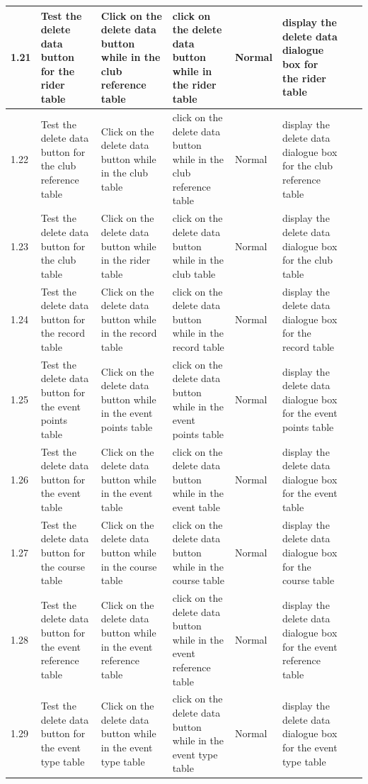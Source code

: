 \begin{landscape}
\begin{center}
\begin{longtable}{|p{1.5cm}|p{2.5cm}|p{2.5cm}|p{2cm}|p{2cm}|p{2cm}|p{2cm}|p{2cm}|}
        1.21 & Test the delete data button for the rider table & Click on the delete data button while in the club reference table & click on the delete data button while in the rider table & Normal & display the delete data dialogue box for the rider table & & \\ \hline
        1.22 & Test the delete data button for the club reference table & Click on the delete data button while in the club table & click on the delete data button while in the club reference table & Normal & display the delete data dialogue box for the club reference table & & \\ \hline
        1.23 & Test the delete data button for the club  table & Click on the delete data button while in the rider table & click on the delete data button while in the club table & Normal & display the delete data dialogue box for the club  table & & \\ \hline
        1.24 & Test the delete data button for the record  table & Click on the delete data button while in the record table & click on the delete data button while in the record table & Normal & display the delete data dialogue box for the record  table & & \\ \hline
        1.25 & Test the delete data button for the event points  table & Click on the delete data button while in the event points table & click on the delete data button while in the event points table & Normal & display the delete data dialogue box for the event points  table & & \\ \hline
        1.26 & Test the delete data button for the event  table & Click on the delete data button while in the event table & click on the delete data button while in the event table & Normal & display the delete data dialogue box for the event  table & & \\ \hline
        1.27 & Test the delete data button for the course  table & Click on the delete data button while in the course table & click on the delete data button while in the course table & Normal & display the delete data dialogue box for the course  table & & \\ \hline
        1.28 & Test the delete data button for the event reference  table & Click on the delete data button while in the event reference table & click on the delete data button while in the event reference table & Normal & display the delete data dialogue box for the event reference  table & & \\ \hline
        1.29 & Test the delete data button for the event type  table & Click on the delete data button while in the event type table & click on the delete data button while in the event type table & Normal & display the delete data dialogue box for the event type  table & & \\ \hline

\end{longtable}
\end{center}
\end{landscape}
